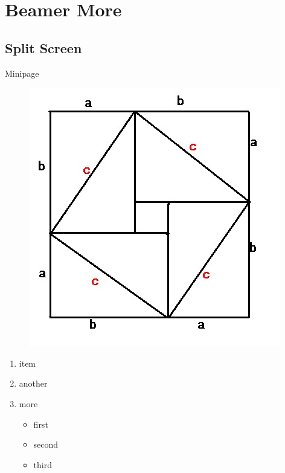 \section{Beamer More}

\subsection{Split Screen}

\begin{frame}{Minipage}
    \begin{minipage}{0.5\linewidth}
        \begin{figure}[h]
            \includegraphics[width=\textwidth]{imgs/pythagorean.jpg}
        \end{figure}
    \end{minipage}%
    \hfill
    \begin{minipage}{0.4\linewidth}
        \begin{enumerate}
            \item item
            \item another
            \item more
            \begin{itemize}
                \item first
                \item second
                \item third
            \end{itemize}
        \end{enumerate}
    \end{minipage}
\end{frame}

